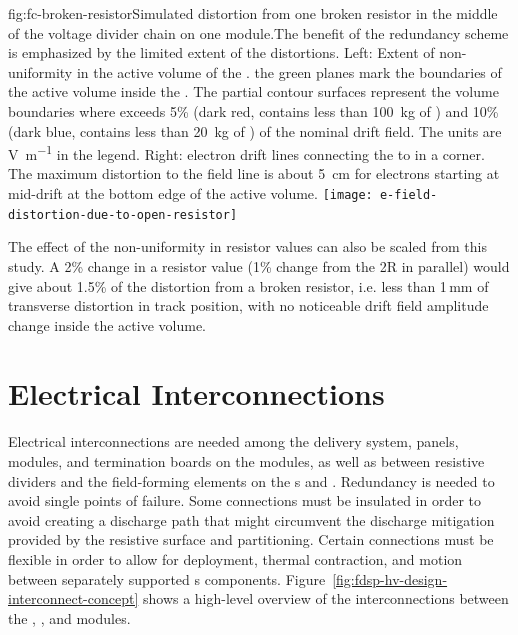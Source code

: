 \begin{dunefigure}{fig:fc-broken-resistor}{Simulated \efield{} distortion from one broken resistor in the middle of the voltage divider chain on one  module.The benefit of the redundancy scheme is emphasized by the limited extent of the \efield distortions. Left: Extent of \efield{} non-uniformity in the active volume of the . the green planes mark the boundaries of the active volume inside the . The partial contour surfaces represent the volume boundaries where \efield{} exceeds 5\% (dark red, contains less than \SI{100}{kg} of ) and 10\% (dark blue, contains less than \SI{20}{kg} of ) of the nominal drift field. The units are \si{\volt\per\m} in the legend. Right: electron drift lines connecting the  to  in a %
 corner.  The maximum distortion to the field line is about \SI{5}{cm} for electrons starting at mid-drift at the bottom edge of the active volume.}
\texttt{[image: e-field-distortion-due-to-open-resistor]}
\end{dunefigure}
The effect of the non-uniformity in resistor values can also be scaled from this study.  A 2\% change in a resistor value (1\% change from the 2R in parallel) would give about 1.5\% of the distortion from a broken resistor, i.e. less than 1\,mm of transverse distortion in track position, with no noticeable drift field amplitude change inside the active volume.
 


\section{Electrical Interconnections} %
\label{sec:fdsp-hv-design-interconnect}


Electrical interconnections are needed among the  delivery system,  panels,  modules, and termination
boards on the  modules, as well as between resistive dividers and
the field-forming elements on the s and .  %
Redundancy is
needed to avoid single points of failure. 
Some connections must be
insulated in order to avoid creating a discharge path that might
circumvent the discharge mitigation provided by the resistive 
surface and  partitioning.  Certain connections must be
flexible in order to allow for  deployment, thermal
contraction, and motion between separately supported s components.  Figure~\ref{fig:fdsp-hv-design-interconnect-concept} shows a high-level
overview of the interconnections between the , , and  modules.

